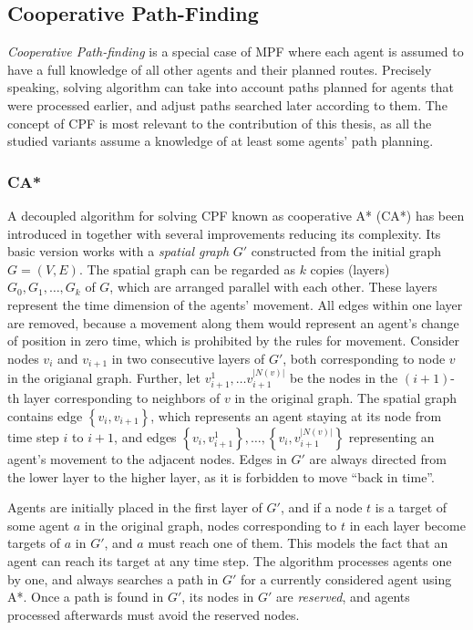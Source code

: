 \subsection{Cooperative Path-Finding}\label{sec:cpf}

\emph{Cooperative Path-finding} \cite{silver05} is a special case of MPF where each agent is assumed to have a full knowledge of all other agents and their planned routes.
Precisely speaking, solving algorithm can take into account paths planned for agents that were processed earlier, and adjust paths searched later according to them.
The concept of CPF is most relevant to the contribution of this thesis, as all the studied variants assume a knowledge of at least some agents' path planning.

\subsubsection{CA*}

A decoupled algorithm for solving CPF known as cooperative A* (CA*) has been introduced in \cite{silver05} together with several improvements reducing its complexity.
Its basic version works with a \emph{spatial graph} $G'$ constructed from the initial graph $G=(V, E)$.
The spatial graph can be regarded as $k$ copies (layers) $G_0, G_1,\dots,G_k$ of $G$, which are arranged parallel with each other.
These layers represent the time dimension of the agents' movement.
All edges within one layer are removed, because a movement along them would represent an agent's change of position in zero time, which is prohibited by the rules for movement.
Consider nodes $v_i$ and $v_{i+1}$ in two consecutive layers of $G'$, both corresponding to node $v$ in the origianal graph.
Further, let $v_{i+1}^1,\dots v_{i+1}^{|N(v)|}$ be the nodes in the $(i+1)$-th layer corresponding to neighbors of $v$ in the original graph.
The spatial graph contains edge $\left\{v_i,v_{i+1}\right\}$, which represents an agent staying at its node from time step $i$ to $i+1$, 
and edges $\left\{v_i,v_{i+1}^{1}\right\},\dots,\left\{v_i,v_{i+1}^{|N(v)|}\right\}$ representing an agent's movement to the adjacent nodes.
Edges in $G'$ are always directed from the lower layer to the higher layer, as it is forbidden to move ``back in time''.

Agents are initially placed in the first layer of $G'$, and if a node $t$ is a target of some agent $a$ in the original graph, nodes corresponding to $t$ in each layer become targets of $a$ in $G'$,
and $a$ must reach one of them.
This models the fact that an agent can reach its target at any time step.
The algorithm processes agents one by one, and always searches a path in $G'$ for a currently considered agent using A*.
Once a path is found in $G'$, its nodes in $G'$ are \emph{reserved}, and agents processed afterwards must avoid the reserved nodes.

